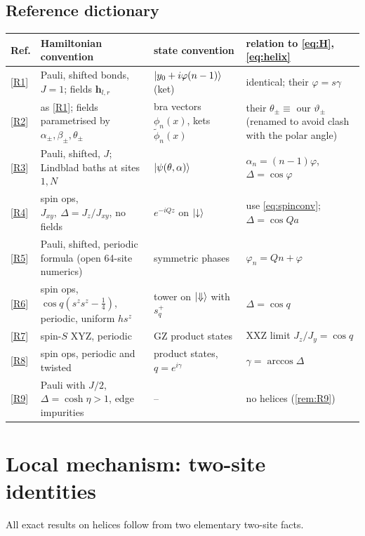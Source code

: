\documentclass[11pt,a4paper]{article}
\theoremstyle{definition}
\begin{document}
\subsection{Reference dictionary}
\begin{center}
\small
\begin{longtable}{p{1.2cm}p{4.6cm}p{4.0cm}p{4.6cm}}
\toprule
Ref. & Hamiltonian convention & state convention & relation to \eqref{eq:H},\eqref{eq:helix}\\ \midrule
\ref{R1} & Pauli, shifted bonds, $J=1$; fields $\mathbf h_{l,r}$ & $\ket{y_0+i\varphi(n-1)}$ (ket) & identical; their $\varphi=s\gamma$\\
\ref{R2} & as \ref{R1}; fields parametrised by $\alpha_\pm,\beta_\pm,\theta_\pm$ & bra vectors $\phi_n(x)$, kets $\tilde\phi_n(x)$ & their $\theta_\pm\equiv$ our $\vartheta_\pm$ (renamed to avoid clash with the polar angle)\\
\ref{R3} & Pauli, shifted, $J$; Lindblad baths at sites $1,N$ & $\ket{\psi(\theta,\alpha)}$ & $\alpha_n=(n-1)\varphi$, $\Delta=\cos\varphi$\\
\ref{R4} & spin ops, $J_{xy},\ \Delta=J_z/J_{xy}$, no fields & $e^{-iQz}$ on $\ket\downarrow$ & use \eqref{eq:spinconv}; $\Delta=\cos Qa$\\
\ref{R5} & Pauli, shifted, periodic formula (open 64-site numerics) & symmetric phases & $\varphi_n=Qn+\varphi$\\
\ref{R6} & spin ops, $\cos q(s^zs^z-\tfrac14)$, periodic, uniform $h s^z$ & tower on $\ket\Downarrow$ with $s_q^+$ & $\Delta=\cos q$\\
\ref{R7} & spin-$S$ XYZ, periodic & GZ product states & XXZ limit $J_z/J_y=\cos q$\\
\ref{R8} & spin ops, periodic and twisted & product states, $q=e^{i\gamma}$ & $\gamma=\arccos\Delta$\\
\ref{R9} & Pauli with $J/2$, $\Delta=\cosh\eta>1$, edge impurities & -- & no helices (\cref{rem:R9})\\ \bottomrule
\end{longtable}
\end{center}

\section{Local mechanism: two-site identities}\label{sec:local}

All exact results on helices follow from two elementary two-site facts.
\end{document}
